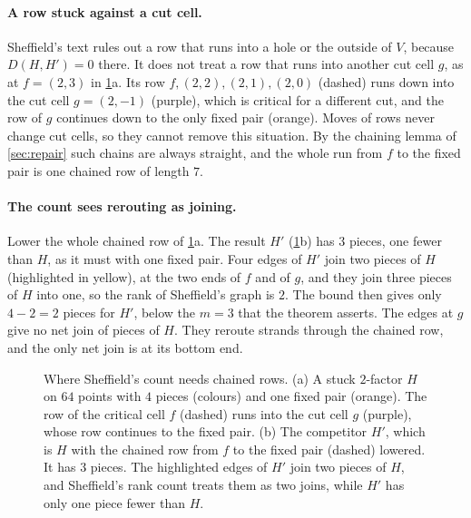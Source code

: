 \documentclass[11pt]{article}
\theoremstyle{plain}
\theoremstyle{definition}
\theoremstyle{remark}
\begin{document}
\paragraph{A row stuck against a cut cell.}
Sheffield's text rules out a row that runs into a hole or the outside of $V$, because $D(H,H')=0$ there.
It does not treat a row that runs into another cut cell $g$, as at $f=(2,3)$ in \cref{fig:sheffail}a.
Its row $f,(2,2),(2,1),(2,0)$ (dashed) runs down into the cut cell $g=(2,-1)$ (purple), which is
critical for a different cut, and the row of $g$ continues down to the only fixed pair (orange).
Moves of rows never change cut cells, so they cannot remove this situation.
By the chaining lemma of \cref{sec:repair} such chains are always straight, and the whole run from
$f$ to the fixed pair is one chained row of length $7$.

\paragraph{The count sees rerouting as joining.}
Lower the whole chained row of \cref{fig:sheffail}a.
The result $H'$ (\cref{fig:sheffail}b) has $3$ pieces, one fewer than $H$, as it must with one fixed
pair.
Four edges of $H'$ join two pieces of $H$ (highlighted in yellow), at the two ends of $f$ and of $g$, and they join
three pieces of $H$ into one, so the rank of Sheffield's graph is $2$.
The bound then gives only $4-2=2$ pieces for $H'$, below the $m=3$ that the theorem asserts.
The edges at $g$ give no net join of pieces of $H$.
They reroute strands through the chained row, and the only net join is at its bottom end.

\begin{figure}[ht]
\centering

\caption{Where Sheffield's count needs chained rows.
(a) A stuck $2$-factor $H$ on $64$ points with $4$ pieces (colours) and one fixed pair (orange).
The row of the critical cell $f$ (dashed) runs into the cut cell $g$ (purple), whose row continues
to the fixed pair.
(b) The competitor $H'$, which is $H$ with the chained row from $f$ to the fixed pair (dashed) lowered.
It has $3$ pieces.
The highlighted edges of $H'$ join two pieces of $H$, and Sheffield's rank count treats them as two joins,
while $H'$ has only one piece fewer than $H$.}
\label{fig:sheffail}
\end{figure}
\end{document}
